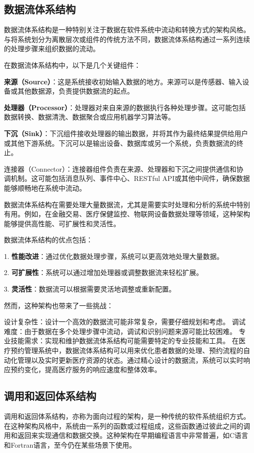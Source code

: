\subsection{数据流体系结构}
数据流体系结构是一种特别关注于数据在软件系统中流动和转换方式的架构风格。与将系统划分为离散层次或组件的传统方法不同，数据流体系结构通过一系列连续的处理步骤来组织数据的流动。

在数据流体系结构中，以下是几个关键组件：

\textbf{来源（Source）}：这是系统接收初始输入数据的地方。来源可以是传感器、输入设备或其他数据源，负责提供数据流的起点。

\textbf{处理器（Processor）}：处理器对来自来源的数据执行各种处理步骤。这可能包括数据转换、数据清洗、数据聚合或应用机器学习算法等。

\textbf{下沉（Sink）}：下沉组件接收处理器的输出数据，并将其作为最终结果提供给用户或其他下游系统。下沉可以是输出设备、数据库或另一个系统，负责数据流的终止。

连接器（Connector）：连接器组件负责在来源、处理器和下沉之间提供通信和协调机制。这可能包括消息队列、事件中心、RESTful API或其他中间件，确保数据能够顺畅地在系统中流动。

数据流体系结构在需要处理大量数据流，尤其是需要实时处理和分析的系统中特别有用。例如，在金融交易、医疗保健监控、物联网设备数据处理等领域，这种架构能够提供高性能、可扩展性和灵活性。

数据流体系结构的优点包括：

1. \textbf{性能改进}：通过优化数据处理步骤，系统可以更高效地处理大量数据。

2. \textbf{可扩展性}：系统可以通过增加处理器或调整数据流来轻松扩展。

3. \textbf{灵活性}：数据流可以根据需要灵活地调整或重新配置。

然而，这种架构也带来了一些挑战：

设计复杂性：设计一个高效的数据流可能非常复杂，需要仔细规划和考虑。
调试难度：由于数据在多个处理步骤中流动，调试和识别问题来源可能比较困难。
专业技能需求：实现和维护数据流体系结构可能需要特定的专业技能和工具。
在医疗预约管理系统中，数据流体系结构可以用来优化患者数据的处理、预约流程的自动化管理以及实时更新医疗资源的状态。通过精心设计的数据流，系统可以实时响应预约变化，提高医疗服务的响应速度和整体效率。

\subsection{调用和返回体系结构}

调用和返回体系结构，亦称为面向过程的架构，是一种传统的软件系统组织方式。在这种架构风格中，系统由一系列的函数或过程组成，这些函数通过彼此之间的调用和返回来实现通信和数据交换。这种架构在早期编程语言中非常普遍，如C语言和Fortran语言，至今仍在某些场景下使用。


